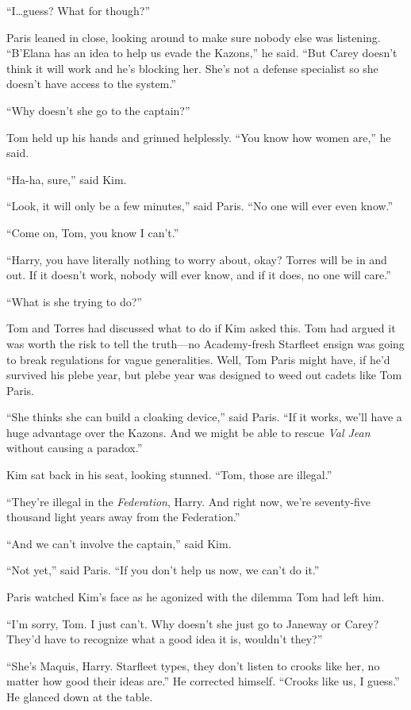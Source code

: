 \documentclass[twoside,letterpaper,12pt]{memoir}
\begin{document}
``I\ldots guess? What for though?'' 

Paris leaned in close, looking around to make sure nobody else was listening. ``B'Elana has an idea to help us evade the Kazons,'' he said. ``But Carey doesn't think it will work and he's blocking her. She's not a defense specialist so she doesn't have access to the system.'' 

``Why doesn't she go to the captain?'' 

Tom held up his hands and grinned helplessly. ``You know how women are,'' he said. 

``Ha-ha, sure,'' said Kim. 

``Look, it will only be a few minutes,'' said Paris. ``No one will ever even know.'' 

``Come on, Tom, you know I can't.'' 

``Harry, you have literally nothing to worry about, okay? Torres will be in and out. If it doesn't work, nobody will ever know, and if it does, no one will care.'' 

``What is she trying to do?'' 

Tom and Torres had discussed what to do if Kim asked this. Tom had argued it was worth the risk to tell the truth---no Academy-fresh Starfleet ensign was going to break regulations for vague generalities. Well, Tom Paris might have, if he'd survived his plebe year, but plebe year was designed to weed out cadets like Tom Paris. 

``She thinks she can build a cloaking device,'' said Paris. ``If it works, we'll have a huge advantage over the Kazons. And we might be able to rescue \textit{Val Jean} without causing a paradox.'' 

Kim sat back in his seat, looking stunned. ``Tom, those are illegal.'' 

``They're illegal in the \textit{Federation}, Harry. And right now, we're seventy-five thousand light years away from the Federation.'' 

``And we can't involve the captain,'' said Kim. 

``Not yet,'' said Paris. ``If you don't help us now, we can't do it.'' 

Paris watched Kim's face as he agonized with the dilemma Tom had left him. 

``I'm sorry, Tom. I just can't. Why doesn't she just go to Janeway or Carey? They'd have to recognize what a good idea it is, wouldn't they?'' 

``She's Maquis, Harry. Starfleet types, they don't listen to crooks like her, no matter how good their ideas are.'' He corrected himself. ``Crooks like us, I guess.'' He glanced down at the table. 
\end{document}
